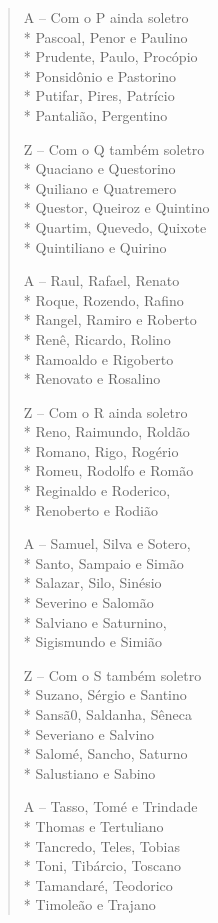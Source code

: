 \begin{verse}
A -- Com o P ainda soletro\\*
Pascoal, Penor e Paulino\\*
Prudente, Paulo, Procópio\\*
Ponsidônio e Pastorino\\*
Putifar, Pires, Patrício\\*
Pantalião, Pergentino

Z -- Com o Q também soletro\\*
Quaciano e Questorino\\*
Quiliano e Quatremero\\*
Questor, Queiroz e Quintino\\*
Quartim, Quevedo, Quixote\\*
Quintiliano e Quirino

A -- Raul, Rafael, Renato\\*
Roque, Rozendo, Rafino\\*
Rangel, Ramiro e Roberto\\*
Renê, Ricardo, Rolino\\*
Ramoaldo e Rigoberto\\*
Renovato e Rosalino

Z -- Com o R ainda soletro\\*
Reno, Raimundo, Roldão\\*
Romano, Rigo, Rogério\\*
Romeu, Rodolfo e Romão\\*
Reginaldo e Roderico,\\*
Renoberto e Rodião

A -- Samuel, Silva e Sotero,\\*
Santo, Sampaio e Simão\\*
Salazar, Silo, Sinésio\\*
Severino e Salomão\\*
Salviano e Saturnino,\\*
Sigismundo e Simião

Z -- Com o S também soletro\\*
Suzano, Sérgio e Santino\\*
Sansã0, Saldanha, Sêneca\\*
Severiano e Salvino\\*
Salomé, Sancho, Saturno\\*
Salustiano e Sabino

A -- Tasso, Tomé e Trindade\\*
Thomas e Tertuliano\\*
Tancredo, Teles, Tobias\\*
Toni, Tibárcio, Toscano\\*
Tamandaré, Teodorico\\*
Timoleão e Trajano


\end{verse}
